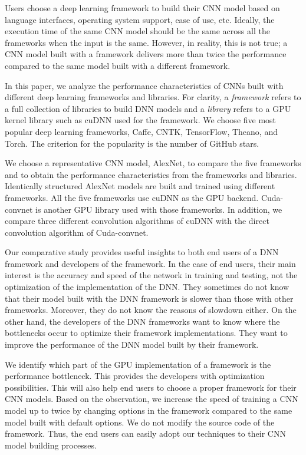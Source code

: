 Users choose a deep learning framework to build their CNN model based on language interfaces, operating system support, ease of use, etc. Ideally, the execution time of the same CNN model should be the same across all the frameworks when the input is the same. However, in reality, this is not true; a CNN model built with a framework delivers more than twice the performance compared to the same model built with a different framework\cite{DBLP:journals/corr/BahrampourRSS15,DBLP:journals/corr/ShiWXC16}. 

In this paper, we analyze the performance characteristics of CNNs built with different deep learning frameworks and libraries. For clarity, a \textit{framework} refers to a full collection of libraries to build DNN models and a \textit{library} refers to a GPU kernel library such as cuDNN used for the framework. We choose five most popular deep learning frameworks, Caffe\cite{jia2014caffe}, CNTK\cite{cntk}, TensorFlow\cite{tensorflow2015-whitepaper}, Theano\cite{DBLP:journals/corr/Al-RfouAAa16}, and Torch\cite{torch}.
The criterion for the popularity is the number of GitHub stars\cite{github}.

We choose a representative CNN model, AlexNet\cite{krizhevsky2012imagenet}, to compare the five frameworks and to obtain the performance characteristics from the frameworks and libraries. Identically structured AlexNet models are built and trained using different frameworks. All the five frameworks use cuDNN as the GPU backend. Cuda-convnet\cite{cuda-convnet} is another GPU library used with those frameworks. In addition, we compare three different convolution algorithms of cuDNN with the direct convolution algorithm of Cuda-convnet.

Our comparative study provides useful insights to both end users of a DNN framework and developers of the framework. In the case of end users, their main interest is the accuracy and speed of the network in training and testing, not the optimization of the implementation of the DNN. They sometimes do not know that their model built with the DNN framework is slower than those with other frameworks. Moreover, they do not know the reasons of slowdown either. On the other hand, the developers of the DNN frameworks want to know where the bottlenecks occur to optimize their framework implementations. They want to improve the performance of the DNN model built by their framework.

We identify which part of the GPU implementation of a framework is the performance bottleneck. This provides the developers with optimization possibilities. This will also help end users to choose a proper framework for their CNN models. Based on the observation, we increase the speed of training a CNN model up to twice by changing options in the framework compared to the same model built with default options. We do not modify the source code of the framework. Thus, the end users can easily adopt our techniques to their CNN model building processes.

